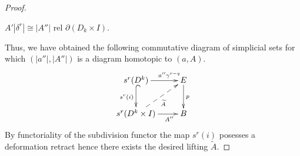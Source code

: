 \documentclass[oneside, 12pt]{amsart}
\theoremstyle{plain}
\numberwithin{equation}{section}
\numberwithin{lemma}{section}
\theoremstyle{remark}
\theoremstyle{definition}
\begin{document}
\begin{proof}
\begin{itemize}
    $A'|\delta^r|\cong |A''|$ rel $\partial (D_k \times I)$.
 \end{itemize}
 Thus, we have obtained the following commutative diagram of simplicial sets for which $(|a''|, |A''|)$ is a diagram homotopic to $(a, A)$.
   \begin{equation} \nonumber \xymatrix{ 
    s^{r}(D^k)          \ar[r]^(0.7){a''\gamma^{r-q}}  \ar@{^{(}->}_{s^{r}(i)}[d] & E \ar[d]^{p}  \\
    s^{r}(D^k \times I) \ar[r]_(0.7){A''}  \ar@{-->}[ru]_{\widetilde{A}} & B}
   \end{equation}
 By functoriality of the subdivision functor the map $s^{r}(i)$ posesses a deformation retract hence there exists the desired lifting $\widetilde{A}$.
 \end{proof}
 

\printbibliography
\end{document}

